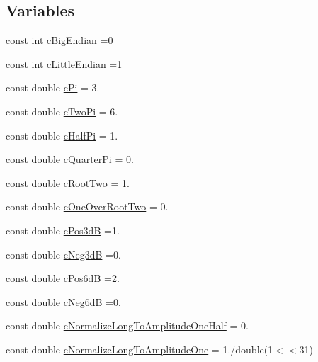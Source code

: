\subsection*{Variables}
\begin{DoxyCompactItemize}
\item 
const int \mbox{\hyperlink{a00852_af4c24d9d2042fe4252db5431ef126d00}{c\+Big\+Endian}} =0
\item 
const int \mbox{\hyperlink{a00852_af7fcadf3ad159bf29bbe5a1c494827f2}{c\+Little\+Endian}} =1
\item 
const double \mbox{\hyperlink{a00852_a8e084631426285b3771b32dd9bb0d1a0}{c\+Pi}} = 3.
\item 
const double \mbox{\hyperlink{a00852_a13d2c593bc19660c60caf48961f16361}{c\+Two\+Pi}} = 6.
\item 
const double \mbox{\hyperlink{a00852_a5496b80979f89206ab4966721ef09e07}{c\+Half\+Pi}} = 1.
\item 
const double \mbox{\hyperlink{a00852_ad4d53f57051266ed14dc1632e95cb04e}{c\+Quarter\+Pi}} = 0.
\item 
const double \mbox{\hyperlink{a00852_af5ff0caa18f36334fd5c52e97f4a0cad}{c\+Root\+Two}} = 1.
\item 
const double \mbox{\hyperlink{a00852_a0ae4975165aaf788ed120dbdd82a3cd7}{c\+One\+Over\+Root\+Two}} = 0.
\item 
const double \mbox{\hyperlink{a00852_ad25c51177cb216caae3b4747b028d8ba}{c\+Pos3dB}} =1.
\item 
const double \mbox{\hyperlink{a00852_af6f212fd5bb0df08db615fffe4445a3d}{c\+Neg3dB}} =0.
\item 
const double \mbox{\hyperlink{a00852_aade00875e4e88b00d991197f574c42ed}{c\+Pos6dB}} =2.
\item 
const double \mbox{\hyperlink{a00852_aca5925abc898233b406504d92ee9ef4c}{c\+Neg6dB}} =0.
\item 
const double \mbox{\hyperlink{a00852_a93ce2d3935dc06b1c4c887568df84788}{c\+Normalize\+Long\+To\+Amplitude\+One\+Half}} = 0.
\item 
const double \mbox{\hyperlink{a00852_ad30333177ff94148492a02325045a827}{c\+Normalize\+Long\+To\+Amplitude\+One}} = 1./double(1$<$$<$31)
\item 
$$
\end{DoxyCompactItemize}
